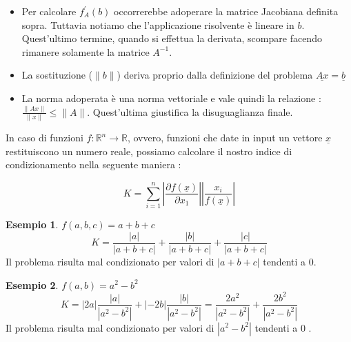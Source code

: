 \documentclass[12pt, a4paper]{book}
\theoremstyle{definition}
\newtheorem{exmp}{Esempio}[section]
\newcommand{\VarMtrx}[1]{\ensuremath{\underline{#1}}}
\begin{document}
\begin{flushleft}
\begin{itemize}
	\item Per calcolare $f^{'}_{A}(b)$ occorrerebbe adoperare la matrice Jacobiana definita sopra. Tuttavia notiamo che l'applicazione risolvente è lineare in $b$. Quest'ultimo termine, quando si effettua la derivata, scompare facendo rimanere solamente la matrice $A^{-1}$. 
	\item La sostituzione ($\lVert b \rVert$) deriva proprio dalla definizione del problema $\VarMtrx{Ax} = \VarMtrx{b}$
	\item La norma adoperata è una norma vettoriale e vale quindi la relazione : $\frac{\lVert \VarMtrx{Ax} \rVert}{ \lVert x \rVert} \leq \lVert A \rVert$. Quest'ultima giustifica la disuguaglianza finale. 
\end{itemize}

In caso di funzioni $f: \mathbb{R}^{n} \rightarrow \mathbb{R}$, ovvero,  funzioni che date in input un vettore $\VarMtrx{x}$ restituiscono un numero reale, possiamo calcolare il nostro indice di condizionamento nella seguente maniera : 

\[ 
	K = \sum_{i = 1}^{n} 
				\displaystyle\left\lvert 
					\dfrac{\partial f(\VarMtrx{x})}{\partial x_{1}}  
				\right\rvert 
				\displaystyle\left\lvert
					\dfrac{x_{i}}{f(\VarMtrx{x})}
				\right\rvert 
\]

\begin{exmp}
$f(a,b,c) = a+b+c$
\[ 	
	K = \frac{|a|}{|a+b+c|} + \frac{|b|}{|a+b+c|}  + \frac{|c|}{|a+b+c|}
\]
Il problema risulta mal condizionato per valori di $|a+b+c|$ tendenti a 0.
\end{exmp}

\begin{exmp}
$f(a,b) = a^{2}-b^{2}$
\[ 	
	K = |2a| \frac{|a|}{|a^{2}-b^{2}|} + |-2b| \frac{|b|}{|a^{2}-b^{2}|} =  \frac{2a^{2}}{|a^{2}-b^{2}|} + \frac{2b^{2}}{|a^{2}-b^{2}|} 
\]
Il problema risulta mal condizionato per valori di $|a^{2}-b^{2}|$ tendenti a 0 .
\end{exmp}
\end{flushleft}
\end{document}
